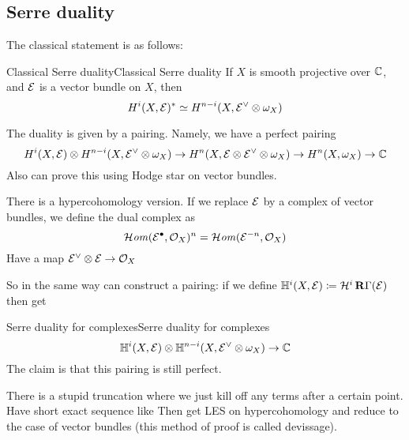 \subsection{Serre duality}

The classical statement is as follows:

\begin{proposition}{Classical Serre duality}{Classical Serre duality}
    If $X$ is smooth projective over $\mathbb{C}$, and $\mathcal{E}$ is a vector bundle on $X$, then
    \begin{equation*}
        H^i(X,\mathcal{E})^* \simeq H^{n-i}(X,\mathcal{E}^\vee\otimes\omega_X)
    \end{equation*}
\end{proposition}

The duality is given by a pairing. Namely, we have a perfect pairing
\begin{equation*}
    H^i(X,\mathcal{E})\otimes H^{n-i}(X,\mathcal{E}^\vee\otimes\omega_X)
        \to H^n(X,\mathcal{E}\otimes\mathcal{E}^\vee\otimes\omega_X)
        \to H^n(X,\omega_X)
        \to \mathbb{C} 
\end{equation*}
Also can prove this using Hodge star on vector bundles.

There is a hypercohomology version. If we replace $\mathcal{E}$ by a complex of vector bundles, we define the dual complex as
\begin{equation*}
    \operatorname{\mathcal{H}\mathit{om}}(\mathcal{E}^\bullet,\mathcal{O}_X)^n = \operatorname{\mathcal{H}\mathit{om}}(\mathcal{E}^{-n},\mathcal{O}_X)
\end{equation*}
Have a map $\mathcal{E}^\vee\otimes\mathcal{E}\to\mathcal{O}_X$


So in the same way can construct a pairing: if we define $\mathbb{H}^i(X,\mathcal{E})\coloneqq\mathcal{H}^i\operatorname{\mathbf{R}\Gamma}(\mathcal{E})$ then get

\begin{proposition}{Serre duality for complexes}{Serre duality for complexes}
    \begin{equation*}
        \mathbb{H}^i(X,\mathcal{E})\otimes\mathbb{H}^{n-i}(X,\mathcal{E}^\vee\otimes\omega_X)\to\mathbb{C}
    \end{equation*}
    The claim is that this pairing is still perfect.
\end{proposition}

There is a stupid truncation where we just kill off any terms after a certain point. Have short exact sequence like %
Then get LES on hypercohomology and reduce to the case of vector bundles (this method of proof is called devissage).

